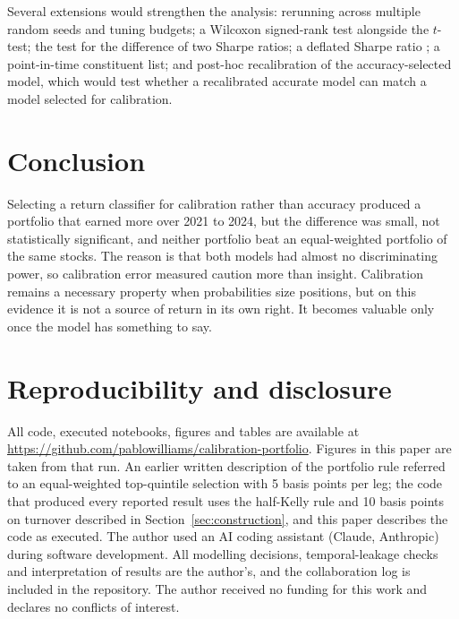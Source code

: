 \documentclass[11pt,a4paper]{article}
\begin{document}
Several extensions would strengthen the analysis: rerunning across multiple random seeds and tuning budgets; a Wilcoxon signed-rank test alongside the $t$-test; the \citet{ledoit2008} test for the difference of two Sharpe ratios; a deflated Sharpe ratio \citep{bailey2014}; a point-in-time constituent list; and post-hoc recalibration of the accuracy-selected model, which would test whether a recalibrated accurate model can match a model selected for calibration.

\section{Conclusion}

Selecting a return classifier for calibration rather than accuracy produced a portfolio that earned more over 2021 to 2024, but the difference was small, not statistically significant, and neither portfolio beat an equal-weighted portfolio of the same stocks. The reason is that both models had almost no discriminating power, so calibration error measured caution more than insight. Calibration remains a necessary property when probabilities size positions, but on this evidence it is not a source of return in its own right. It becomes valuable only once the model has something to say.

\section*{Reproducibility and disclosure}

All code, executed notebooks, figures and tables are available at \url{https://github.com/pablowilliams/calibration-portfolio}. Figures in this paper are taken from that run. An earlier written description of the portfolio rule referred to an equal-weighted top-quintile selection with 5 basis points per leg; the code that produced every reported result uses the half-Kelly rule and 10 basis points on turnover described in Section~\ref{sec:construction}, and this paper describes the code as executed. The author used an AI coding assistant (Claude, Anthropic) during software development. All modelling decisions, temporal-leakage checks and interpretation of results are the author's, and the collaboration log is included in the repository. The author received no funding for this work and declares no conflicts of interest.
\end{document}
